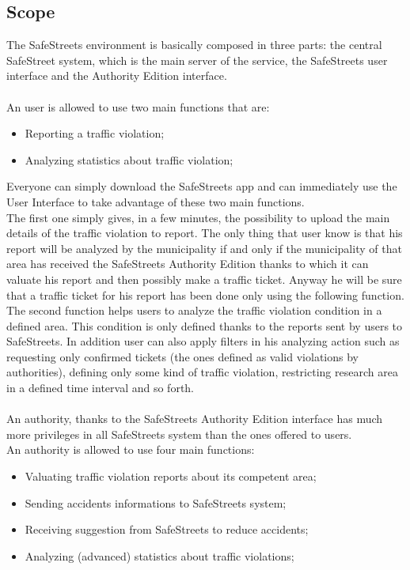 \documentclass{article}
\begin{document}
		\subsection{Scope}
			The SafeStreets environment is basically composed in three parts: the central SafeStreet system, which is the main server of the service, the SafeStreets user interface and the Authority Edition interface. \\\\
			An user is allowed to use two main functions that are:
			\begin{itemize}
				\item Reporting a traffic violation;
				\item Analyzing statistics about traffic violation;
			\end{itemize}
			Everyone can simply download the SafeStreets app and can immediately use the User Interface to take advantage of these two main functions.\\
	    	The first one simply gives, in a few minutes, the possibility to upload the main details of the traffic violation to report. The only thing that user know is that his report will be analyzed by the municipality if and only if the municipality of that area has received the SafeStreets Authority Edition thanks to which it can valuate his report and then possibly make a traffic ticket.
	    	Anyway he will be sure that a traffic ticket for his report has been done only using the following function.\\
	    	The second function helps users to analyze the traffic violation condition in a defined area. This condition is only defined thanks to the reports sent by users to SafeStreets. In addition user can also apply filters in his analyzing action such as requesting only confirmed tickets (the ones defined as valid violations by authorities), defining only some kind of traffic violation, restricting research area in a defined time interval and so forth.\\\\
	    	An authority, thanks to the SafeStreets Authority Edition interface has much more privileges in all SafeStreets system than the ones offered to users. \\An authority is allowed to use four main functions:
	    	\begin{itemize}
	    		\item Valuating traffic violation reports about its competent area;
	    		\item Sending accidents informations to SafeStreets system;
	    		\item Receiving suggestion from SafeStreets to reduce accidents;
	    		\item Analyzing (advanced) statistics about traffic violations;
	    	\end{itemize}
\end{document}
